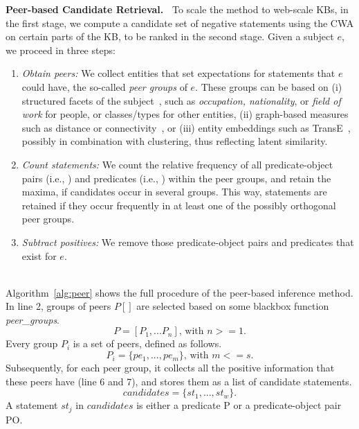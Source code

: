 \noindent
\textbf{Peer-based Candidate Retrieval.\ }
To scale the method to web-scale KBs, in the first stage, we compute a candidate set of negative statements using the CWA on certain parts of the KB, to be ranked in the second stage. Given a subject $e$, we proceed in three steps:
\begin{enumerate}[noitemsep,topsep=0pt,parsep=0pt,partopsep=0pt]
    \item \textit{Obtain peers:} We collect entities that set expectations for statements that $e$ could have, the so-called \textit{peer groups} of $e$. These groups can be based on (i) structured facets of the subject~\cite{RECOIN}, such as \textit{occupation, nationality}, or \emph{field of work} for people, or classes/types for other entities, (ii) graph-based measures such as distance or connectivity~\cite{ponza}, or (iii) entity embeddings such as TransE~\cite{transE}, possibly in combination with clustering, thus reflecting latent similarity. 
    \item \textit{Count statements:} We count the relative frequency of all predicate-object pairs (i.e., ) and predicates (i.e., ) within the peer groups, and retain the maxima, if candidates occur in several groups. This way, statements are retained if they occur frequently in at least one of the possibly orthogonal peer groups.
    \item \textit{Subtract positives:} We remove those predicate-object pairs and predicates that exist for $e$.
\end{enumerate}
\  \\
Algorithm~\ref{alg:peer} shows the full procedure of the peer-based inference method. 
In line 2, groups of peers $P[]$ are selected based on some blackbox function \textit{peer\_groups}.
\begin{equation*}
P = [P_1, ... P_n] \text{, with } n>=1.
\end{equation*}
\noindent
Every group $P_i$ is a set of peers, defined as follows.
\begin{equation*}
P_i = \{pe_1, ..., pe_m\} \text{, with } m<=s.
\end{equation*}
Subsequently, for each peer group, it collects all the positive information that these peers have (line 6 and 7), and stores them as a list of candidate statements.
\begin{equation*}
candidates = \{st_1, ..., st_w\}.
\end{equation*}
A statement $st_j$ in $candidates$ is either a predicate P or a predicate-object pair PO.
